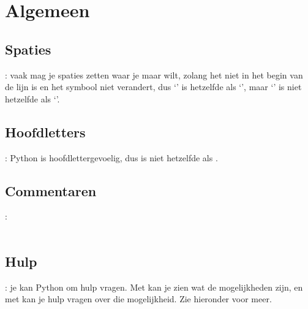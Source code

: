 
\section{Algemeen}
  \subsection{Spaties}: vaak mag je spaties zetten waar je maar wilt, zolang het
  niet in het begin van de lijn is en het symbool niet verandert, dus \newline
  `' is hetzelfde als `', maar `' is
  niet hetzelfde als \newline `'.

  \subsection{Hoofdletters}: Python is hoofdlettergevoelig, dus 
  is niet hetzelfde als .

  \subsection{Commentaren}:\\
  \,

  \subsection{Hulp}: je kan Python om hulp vragen. Met  kan je zien wat
  de mogelijkheden zijn, en met  kan je hulp vragen over die
  mogelijkheid. Zie hieronder voor meer.

